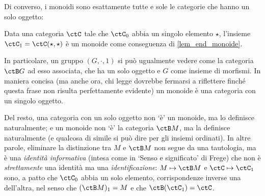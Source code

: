Di converso, i monoidi sono esattamente tutte e sole le categorie che hanno un solo oggetto:
\begin{theorem}\label{cat_sonomon}
	Data una categoria \(\ctC\) tale che \(\ctC_0\) abbia un singolo elemento \(\star\), l'insieme \(\ctC_1 = \Hom{\ctC}(\star,\star)\) è un monoide come conseguenza di \ref{lem_end_monoide}.
\end{theorem}
%
%
\begin{corollary}\label{cor_cat_mon}
	In particolare, un gruppo \((G,\cdot,1)\) si può ugualmente vedere come la categoria \(\ctB G\) ad esso associata, che ha un solo oggetto e \(G\) come insieme di morfismi. In maniera concisa (ma anche ora, chi legge dovrebbe fermarsi a riflettere finché questa frase non risulta perfettamente evidente) un monoide è una categoria con un singolo oggetto.%
\end{corollary}
\begin{remark}
	Del resto, una categoria con un solo oggetto non `è' un monoide, ma lo definisce naturalmente; e un monoide non `è' la categoria \(\ctB M\), ma la definisce naturalmente (e qualcosa di simile si può dire per gli insiemi ordinati). In altre parole, eliminare la distinzione tra \(M\) e \(\ctB M\) non segue da una tautologia, ma è una \emph{identità informativa} (intesa come in `Senso e significato' di Frege) che non è \emph{strettamente} una identità ma una \emph{identificazione}: \(M\mapsto \ctB M\) e \(\ctC\mapsto \ctC_1\) sono, a patto che \(\ctC_0\) abbia un solo elemento, corrispondenze inverse una dell'altra, nel senso che \((\ctB M)_1 = M\) e che \(\ctB(\ctC_1) = \ctC\).
\end{remark}

